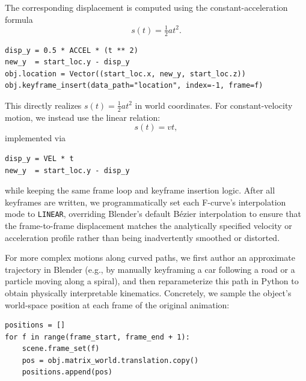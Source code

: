 The corresponding displacement is computed using the constant-acceleration formula
\[
s(t) = \tfrac{1}{2} a t^{2}.
\]

\begin{verbatim}
disp_y = 0.5 * ACCEL * (t ** 2)
new_y  = start_loc.y - disp_y
obj.location = Vector((start_loc.x, new_y, start_loc.z))
obj.keyframe_insert(data_path="location", index=-1, frame=f)
\end{verbatim}



This directly realizes $s(t)=\tfrac{1}{2} a t^{2}$ in world coordinates. For constant-velocity motion, we instead use the linear relation:
\[
s(t) = v t,
\]
implemented via

\begin{verbatim}
disp_y = VEL * t
new_y  = start_loc.y - disp_y
\end{verbatim}


while keeping the same frame loop and keyframe insertion logic. After all keyframes are written, we programmatically set each F-curve’s interpolation mode to \texttt{LINEAR}, overriding Blender’s default Bézier interpolation to ensure that the frame-to-frame displacement matches the analytically specified velocity or acceleration profile rather than being inadvertently smoothed or distorted.

For more complex motions along curved paths, we first author an approximate trajectory in Blender (e.g., by manually keyframing a car following a road or a particle moving along a spiral), and then reparameterize this path in Python to obtain physically interpretable kinematics. Concretely, we sample the object’s world-space position at each frame of the original animation:

\begin{verbatim}
positions = []
for f in range(frame_start, frame_end + 1):
    scene.frame_set(f)
    pos = obj.matrix_world.translation.copy()
    positions.append(pos)
\end{verbatim}

